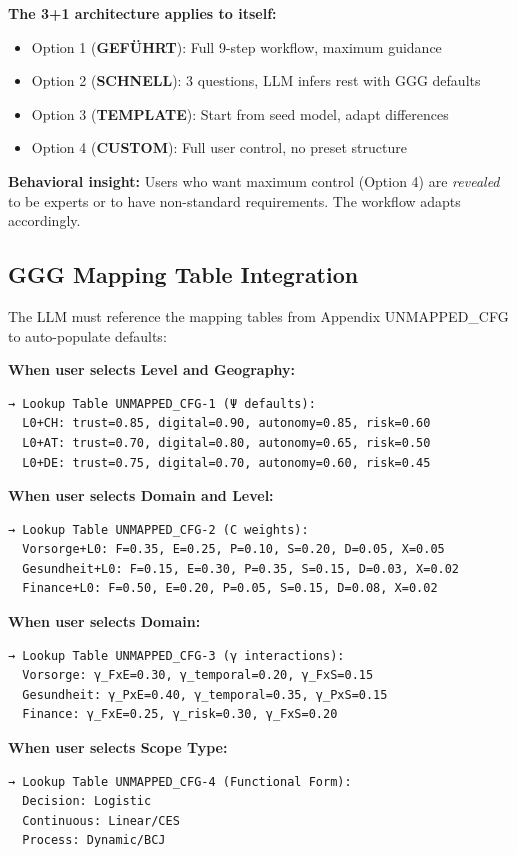 \begin{tcolorbox}[colback=cyan!5!white, colframe=cyan!75!black,
    title=Step 0: Recursive 3+1 for Workflow Selection]
\textbf{The 3+1 architecture applies to itself:}
\begin{itemize}[nosep]
\item Option 1 (\textbf{GEFÜHRT}): Full 9-step workflow, maximum guidance
\item Option 2 (\textbf{SCHNELL}): 3 questions, LLM infers rest with GGG defaults
\item Option 3 (\textbf{TEMPLATE}): Start from seed model, adapt differences
\item Option 4 (\textbf{CUSTOM}): Full user control, no preset structure
\end{itemize}

\textbf{Behavioral insight:} Users who want maximum control (Option 4) are
\textit{revealed} to be experts or to have non-standard requirements. The
workflow adapts accordingly.
\end{tcolorbox}

\subsection{GGG Mapping Table Integration}

The LLM must reference the mapping tables from Appendix UNMAPPED_CFG to auto-populate defaults:

\begin{tcolorbox}[colback=white, colframe=black,
    title=GGG Mapping Reference for LLM]
\small
\textbf{When user selects Level and Geography:}
\begin{verbatim}
→ Lookup Table UNMAPPED_CFG-1 (Ψ defaults):
  L0+CH: trust=0.85, digital=0.90, autonomy=0.85, risk=0.60
  L0+AT: trust=0.70, digital=0.80, autonomy=0.65, risk=0.50
  L0+DE: trust=0.75, digital=0.70, autonomy=0.60, risk=0.45
\end{verbatim}

\textbf{When user selects Domain and Level:}
\begin{verbatim}
→ Lookup Table UNMAPPED_CFG-2 (C weights):
  Vorsorge+L0: F=0.35, E=0.25, P=0.10, S=0.20, D=0.05, X=0.05
  Gesundheit+L0: F=0.15, E=0.30, P=0.35, S=0.15, D=0.03, X=0.02
  Finance+L0: F=0.50, E=0.20, P=0.05, S=0.15, D=0.08, X=0.02
\end{verbatim}

\textbf{When user selects Domain:}
\begin{verbatim}
→ Lookup Table UNMAPPED_CFG-3 (γ interactions):
  Vorsorge: γ_FxE=0.30, γ_temporal=0.20, γ_FxS=0.15
  Gesundheit: γ_PxE=0.40, γ_temporal=0.35, γ_PxS=0.15
  Finance: γ_FxE=0.25, γ_risk=0.30, γ_FxS=0.20
\end{verbatim}

\textbf{When user selects Scope Type:}
\begin{verbatim}
→ Lookup Table UNMAPPED_CFG-4 (Functional Form):
  Decision: Logistic
  Continuous: Linear/CES
  Process: Dynamic/BCJ
\end{verbatim}
\end{tcolorbox}

